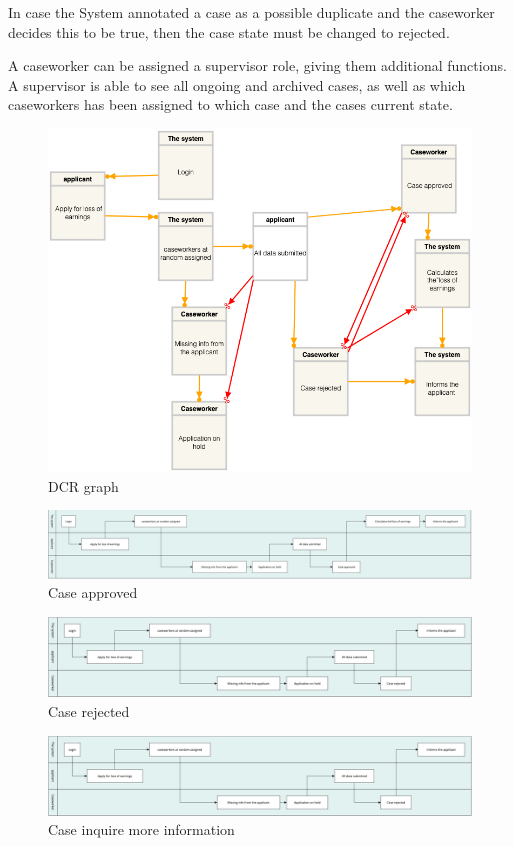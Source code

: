 \vspace{2mm}

In case the System annotated a case as a possible duplicate and the caseworker decides this to be true, then the case state must be changed to rejected.

\vspace{2mm}

A caseworker can be assigned a supervisor role, giving them additional functions. A supervisor is able to see all ongoing and archived cases, as well as which caseworkers has been assigned to which case and the cases current state.
\newpage
\begin{figure}[htb!]
	\includegraphics[width=\textwidth]{img/dcrgraph.png}
	\caption{DCR graph}
\end{figure}

\newpage
\begin{figure}[htb!]
    \centering
    \includegraphics[width=\textwidth]{img/swim-case-approved.png}
    \caption{Case approved}
\end{figure}

\begin{figure}[htb!]
    \centering
    \includegraphics[width=\textwidth]{img/swim-case-rejected.png}
    \caption{Case rejected}
\end{figure}

\begin{figure}[htb!]
    \centering
    \includegraphics[width=\textwidth]{img/swim-case-rejected.png}
    \caption{Case inquire more information}
\end{figure}
